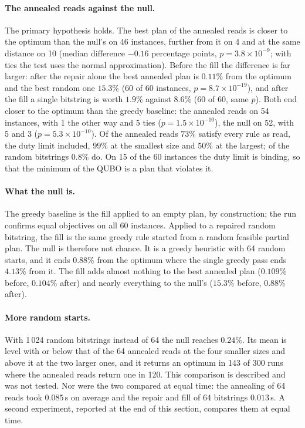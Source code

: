\documentclass[11pt,a4paper]{article}
\begin{document}
\paragraph{The annealed reads against the null.} The primary hypothesis
holds. The best plan of the annealed reads is closer to the optimum than the
null's on 46 instances, further from it on 4 and at the same distance on 10
(median difference $-0.16$ percentage points, $p = 3.8\times10^{-9}$; with
ties the test uses the normal approximation). Before the fill the difference
is far larger: after the repair alone the best annealed plan is $0.11\%$
from the optimum and the best random one $15.3\%$ (60 of 60 instances,
$p = 8.7\times10^{-19}$), and after the fill a single bitstring is worth
$1.9\%$ against $8.6\%$ (60 of 60, same $p$). Both end closer to the optimum
than the greedy baseline: the annealed reads on 54 instances, with 1 the
other way and 5 ties ($p = 1.5\times10^{-10}$), the null on 52, with 5 and 3
($p = 5.3\times10^{-10}$). Of the annealed reads $73\%$ satisfy every rule
as read, the duty limit included, $99\%$ at the smallest size and $50\%$ at
the largest; of the random bitstrings $0.8\%$ do. On 15 of the 60 instances
the duty limit is binding, so that the minimum of the QUBO is a plan that
violates it.

\paragraph{What the null is.} The greedy baseline is the fill applied to an
empty plan, by construction; the run confirms equal objectives on all 60
instances. Applied to a repaired random bitstring, the fill is the same
greedy rule started from a random feasible partial plan. The null is
therefore not chance. It is a greedy heuristic with 64 random starts, and it
ends $0.88\%$ from the optimum where the single greedy pass ends $4.13\%$
from it. The fill adds almost nothing to the best annealed plan ($0.109\%$
before, $0.104\%$ after) and nearly everything to the null's ($15.3\%$
before, $0.88\%$ after).

\paragraph{More random starts.} With 1\,024 random bitstrings instead of 64
the null reaches $0.24\%$. Its mean is level with or below that of the 64
annealed reads at the four smaller sizes and above it at the two larger
ones, and it returns an optimum in 143 of 300 runs where the annealed reads
return one in 120. This comparison is described and was not tested. Nor
were the two compared at equal time: the annealing of 64 reads took
$0.085$\,s on average and the repair and fill of 64 bitstrings $0.013$\,s.
A second experiment, reported at the end of this section, compares them at
equal time.
\end{document}
